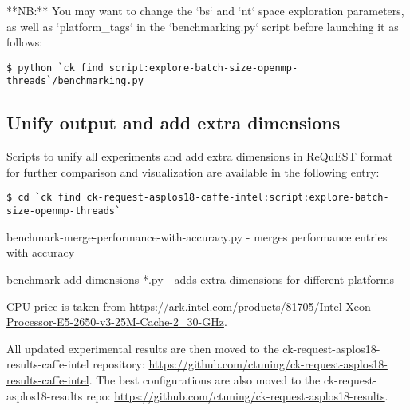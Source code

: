 \documentclass[sigplan]{acmart}
\newenvironment{packed_itemize}{
\begin{itemize}
  \setlength{\itemsep}{1pt}
  \setlength{\parskip}{0pt}
  \setlength{\parsep}{0pt}
}{\end{itemize}}
\begin{document}
**NB:** You may want to change the `bs` and `nt` space exploration parameters, as well as
`platform\_tags` in the `benchmarking.py` script before launching it as follows:

\begin{verbatim}
$ python `ck find script:explore-batch-size-openmp-threads`/benchmarking.py
\end{verbatim}

\subsection{Unify output and add extra dimensions}

Scripts to unify all experiments and add extra dimensions in ReQuEST format for further comparison and visualization are available in the following entry:
\begin{verbatim}
$ cd `ck find ck-request-asplos18-caffe-intel:script:explore-batch-size-openmp-threads`
\end{verbatim}

\begin{packed_itemize}
 \item benchmark-merge-performance-with-accuracy.py - merges performance entries with accuracy
 \item benchmark-add-dimensions-*.py - adds extra dimensions for different platforms
\end{packed_itemize}

CPU price is taken from \url{https://ark.intel.com/products/81705/Intel-Xeon-Processor-E5-2650-v3-25M-Cache-2\_30-GHz}.

All updated experimental results are then moved to the ck-request-asplos18-results-caffe-intel repository: \url{https://github.com/ctuning/ck-request-asplos18-results-caffe-intel}.
The best configurations are also moved to the ck-request-asplos18-results repo: \url{https://github.com/ctuning/ck-request-asplos18-results}.
\end{document}
